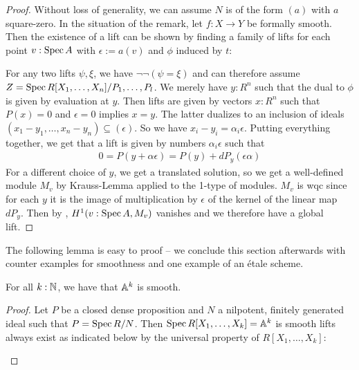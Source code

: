 \begin{proof}
  Without loss of generality, we can assume $N$ is of the form $(a)$ with $a$ square-zero.
  In the situation of the remark, let $f:X\to Y$ be formally smooth.
  Then the existence of a lift can be shown
  by finding a family of lifts for each point $v:\operatorname{Spec} A$ with $\epsilon:=a(v)$ and $\phi$ induced by $t$:
  \begin{center}
  \end{center}
  For any two lifts $\psi,\xi$, we have $\neg\neg(\psi=\xi)$
  and can therefore assume $Z=\operatorname{Spec} R[X_1,\dots,X_n]/P_1,\dots,P_l$.
  We merely have $y:R^n$ such that the dual to $\phi$ is given by evaluation at $y$.
  Then lifts are given by vectors $x:R^n$ such that $P(x)=0$ and $\epsilon = 0$ implies $x=y$.
  The latter dualizes to an inclusion of ideals $(x_1-y_1,\dots,x_n-y_n)\subseteq (\epsilon)$.
  So we have $x_i-y_i=\alpha_i\epsilon$. Putting everything together, we get that a lift is given by numbers $\alpha_i\epsilon$ such that
  \begin{align*}
     0 = P(y+\alpha \epsilon) = P(y)+dP_y(\epsilon\alpha)
  \end{align*}
  For a different choice of $y$, we get a translated solution, so we get a well-defined module $M_v$ by Krauss-Lemma applied to the 1-type of modules.
  $M_v$ is wqc since for each $y$ it is the image of multiplication by $\epsilon$ of the kernel of the linear map $dP_y$.
  Then by \cite{draft}, $H^1(v:\operatorname{Spec} A, M_v)$ vanishes and we therefore have a global lift. 
\end{proof}

The following lemma is easy to proof -- we conclude this section afterwards with counter examples for smoothness and one example of an étale scheme.

\begin{lemma}\label{An-is-smooth}
For all $k:\mathbb{N}$, we have that $\mathbb{A}^k$ is smooth.
\end{lemma}

\begin{proof}
  Let $P$ be a closed dense proposition and $N$ a nilpotent, finitely generated ideal such that $P=\operatorname{Spec} R/N$.
  Then $\operatorname{Spec} R[X_1,\dots,X_k]=\mathbb{A}^k$ is smooth lifts always exist as indicated below by the universal property of $R[X_1,\dots,X_k]$:
  \begin{center}
  \end{center}
\end{proof}

